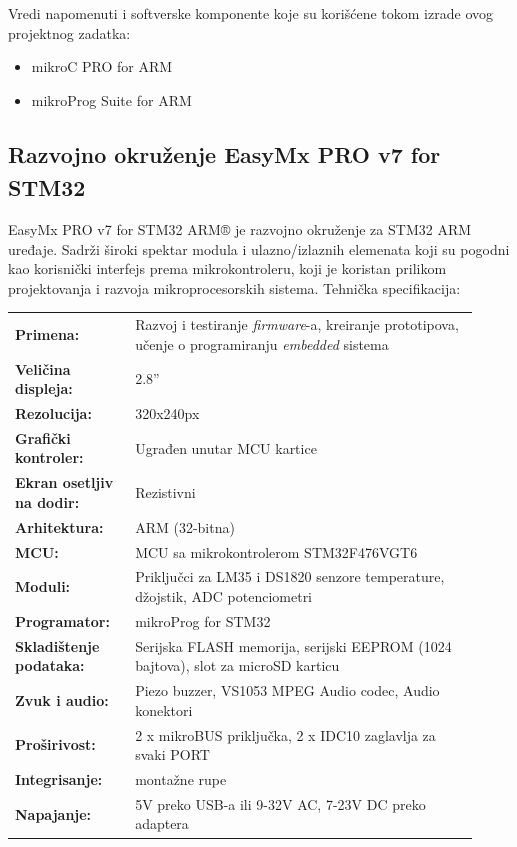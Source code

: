 \documentclass[a4paper, 12pt, oneside, titlepage]{article}
\begin{document}
    \noindent Vredi napomenuti i softverske komponente koje su korišćene tokom izrade ovog projektnog zadatka:
    \begin{itemize}
      \item mikroC PRO for ARM
      \item mikroProg Suite for ARM
    \end{itemize}
    
      \subsection{Razvojno okruženje EasyMx PRO\texttrademark{} v7 for STM32\textsuperscript{\textregistered}}
      EasyMx PRO v7 for STM32 ARM® je razvojno okruženje za STM32 ARM uređaje. Sadrži široki spektar modula i
      ulazno/izlaznih elemenata koji su pogodni kao korisnički interfejs prema mikrokontroleru, koji je koristan
      prilikom projektovanja i razvoja mikroprocesorskih sistema.
      \bigbreak
      \noindent Tehnička specifikacija:
      \bigbreak
      \begin{tabular}{>{\bfseries}p{0.237\linewidth}p{0.678\linewidth}}
	Primena: & Razvoj i testiranje \emph{firmware}-a, kreiranje prototipova, učenje o programiranju \emph{embedded}
	sistema \\
	Veličina displeja: & 2.8'' \\
	Rezolucija: & 320x240px \\
	Grafički kontroler: & Ugrađen unutar MCU kartice \\
	Ekran osetljiv na dodir: & Rezistivni \\
	Arhitektura: & ARM (32-bitna) \\
	MCU: & MCU sa mikrokontrolerom STM32F476VGT6 \\
	Moduli: & Priključci za LM35 i DS1820 senzore temperature, džojstik, ADC potenciometri \\
	Programator: & mikroProg for STM32 \\
	Skladištenje podataka: & Serijska FLASH memorija, serijski EEPROM (1024 bajtova), slot za microSD karticu \\
	Zvuk i audio: & Piezo buzzer, VS1053 MPEG Audio codec, Audio konektori \\
	Proširivost: & 2 x mikroBUS priključka, 2 x IDC10 zaglavlja za svaki PORT \\
	Integrisanje: & montažne rupe \\
	Napajanje: & 5V preko USB-a ili 9-32V AC, 7-23V DC preko adaptera \\
      \end{tabular}
\end{document}
